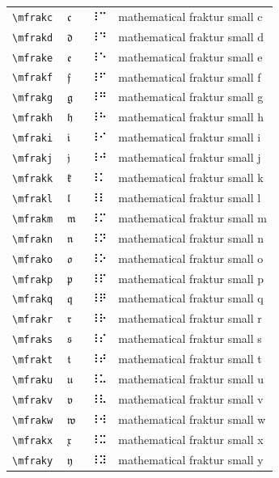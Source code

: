 \documentclass[oneside]{article}
\begin{document}
\begin{longtable}{llll}
\verb|\mfrakc| & $\mfrakc$ &  ⠸⠉  & {mathematical fraktur small c} \\[2ex]
\verb|\mfrakd| & $\mfrakd$ &  ⠸⠙  & {mathematical fraktur small d} \\[2ex]
\verb|\mfrake| & $\mfrake$ &  ⠸⠑  & {mathematical fraktur small e} \\[2ex]
\verb|\mfrakf| & $\mfrakf$ &  ⠸⠋  & {mathematical fraktur small f} \\[2ex]
\verb|\mfrakg| & $\mfrakg$ &  ⠸⠛  & {mathematical fraktur small g} \\[2ex]
\verb|\mfrakh| & $\mfrakh$ &  ⠸⠓  & {mathematical fraktur small h} \\[2ex]
\verb|\mfraki| & $\mfraki$ &  ⠸⠊  & {mathematical fraktur small i} \\[2ex]
\verb|\mfrakj| & $\mfrakj$ &  ⠸⠚  & {mathematical fraktur small j} \\[2ex]
\verb|\mfrakk| & $\mfrakk$ &  ⠸⠅  & {mathematical fraktur small k} \\[2ex]
\verb|\mfrakl| & $\mfrakl$ &  ⠸⠇  & {mathematical fraktur small l} \\[2ex]
\verb|\mfrakm| & $\mfrakm$ &  ⠸⠍  & {mathematical fraktur small m} \\[2ex]
\verb|\mfrakn| & $\mfrakn$ &  ⠸⠝  & {mathematical fraktur small n} \\[2ex]
\verb|\mfrako| & $\mfrako$ &  ⠸⠕  & {mathematical fraktur small o} \\[2ex]
\verb|\mfrakp| & $\mfrakp$ &  ⠸⠏  & {mathematical fraktur small p} \\[2ex]
\verb|\mfrakq| & $\mfrakq$ &  ⠸⠟  & {mathematical fraktur small q} \\[2ex]
\verb|\mfrakr| & $\mfrakr$ &  ⠸⠗  & {mathematical fraktur small r} \\[2ex]
\verb|\mfraks| & $\mfraks$ &  ⠸⠎  & {mathematical fraktur small s} \\[2ex]
\verb|\mfrakt| & $\mfrakt$ &  ⠸⠞  & {mathematical fraktur small t} \\[2ex]
\verb|\mfraku| & $\mfraku$ &  ⠸⠥  & {mathematical fraktur small u} \\[2ex]
\verb|\mfrakv| & $\mfrakv$ &  ⠸⠧  & {mathematical fraktur small v} \\[2ex]
\verb|\mfrakw| & $\mfrakw$ &  ⠸⠺  & {mathematical fraktur small w} \\[2ex]
\verb|\mfrakx| & $\mfrakx$ &  ⠸⠭  & {mathematical fraktur small x} \\[2ex]
\verb|\mfraky| & $\mfraky$ &  ⠸⠽  & {mathematical fraktur small y} \\[2ex]

\end{longtable}
\end{document}
